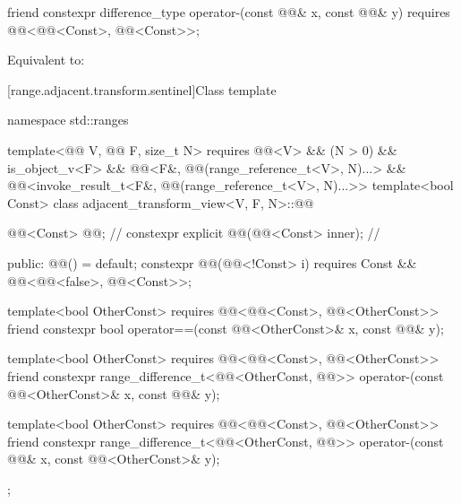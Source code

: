 \begin{itemdecl}
friend constexpr difference_type operator-(const @@& x, const @@& y)
  requires @@<@@<Const>, @@<Const>>;
\end{itemdecl}

\begin{itemdescr}
\pnum
\effects
Equivalent to: 
\end{itemdescr}

[range.adjacent.transform.sentinel]{Class template }

\begin{codeblock}
namespace std::ranges {
  template<@@ V, @@ F, size_t N>
    requires @@<V> && (N > 0) && is_object_v<F> &&
             @@<F&, @@(range_reference_t<V>, N)...> &&
             @@<invoke_result_t<F&, @@(range_reference_t<V>, N)...>>
  template<bool Const>
  class adjacent_transform_view<V, F, N>::@@ {
    @@<Const> @@;                               // \expos
    constexpr explicit @@(@@<Const> inner);   // \expos

  public:
    @@() = default;
    constexpr @@(@@<!Const> i)
      requires Const && @@<@@<false>, @@<Const>>;

    template<bool OtherConst>
      requires @@<@@<Const>, @@<OtherConst>>
    friend constexpr bool operator==(const @@<OtherConst>& x, const @@& y);

    template<bool OtherConst>
      requires @@<@@<Const>, @@<OtherConst>>
    friend constexpr range_difference_t<@@<OtherConst, @@>>
      operator-(const @@<OtherConst>& x, const @@& y);

    template<bool OtherConst>
      requires @@<@@<Const>, @@<OtherConst>>
    friend constexpr range_difference_t<@@<OtherConst, @@>>
      operator-(const @@& x, const @@<OtherConst>& y);
  };
}
\end{codeblock}

